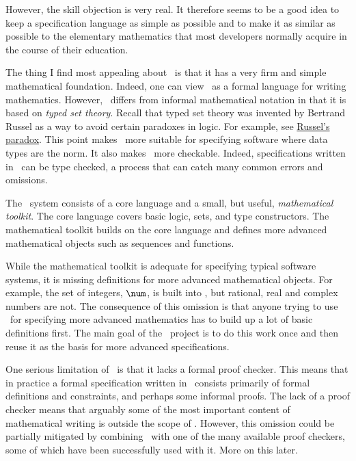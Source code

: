 \documentclass{amsart}
\begin{document}
However, the skill objection is very real.
It therefore seems to be a good idea to keep a specification language as simple as possible and to make it as
similar as possible to the elementary mathematics that most developers normally acquire in the course of their education.

The thing I find most appealing about \ZN\ is that it has a very firm and simple mathematical foundation.
Indeed, one can view \ZN\ as a formal language for writing mathematics. 
However, \ZN\ differs from informal mathematical notation in that it is based on \emph{typed set theory}.
Recall that typed set theory was invented by Bertrand Russel as a way to avoid certain paradoxes in logic.
For example, see \href{https://en.wikipedia.org/wiki/Russell's_paradox}{Russel's paradox}.
This point makes \ZN\ more suitable for specifying software where data types are the norm.
It also makes \ZN\ more checkable. Indeed, specifications written in \ZN\ can be type checked, a process
that can catch many common errors and omissions.

The \ZN\ system consists of a core language and a small, but useful, \emph{mathematical toolkit}.
The core language covers basic logic, sets, and type constructors.
The mathematical toolkit builds on the core language and defines more advanced mathematical objects such as sequences and
functions.

While the mathematical toolkit is adequate for specifying typical software systems, it is missing definitions for more advanced
mathematical objects.
For example, the set of integers, $\num$, is built into \ZN, but rational, real and complex numbers are not.
The consequence of this omission is that anyone trying to use \ZN\ for specifying more advanced mathematics has to build up
a lot of basic definitions first.
The main goal of the \mathz\ project is to do this work once and then reuse it as the basis for more advanced specifications.

One serious limitation of \ZN\ is that it lacks a formal proof checker.
This means that in practice a formal specification written in \ZN\ consists primarily of formal definitions and constraints, and perhaps some
informal proofs.
The lack of a proof checker means that arguably some of the most important content of mathematical writing is outside the scope of
\ZN.
However, this omission could be partially mitigated by combining \ZN\ with one of the many available proof checkers, some of which
have been successfully used with it. More on this later.
\end{document}
